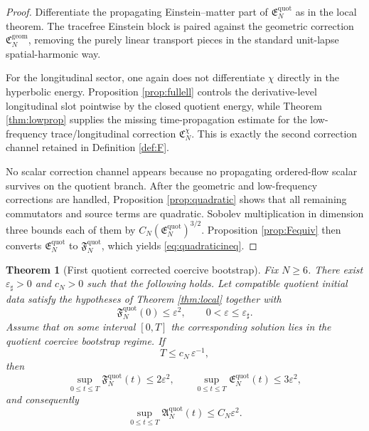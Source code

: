 \documentclass[11pt]{article}
\newtheorem{theorem}{Theorem}
\begin{document}
\begin{proof}
Differentiate the propagating Einstein--matter part of \(\mathfrak E_N^{\mathrm{quot}}\) as in the local theorem. The tracefree Einstein block is paired against the geometric correction \(\mathfrak C_N^{\mathrm{geom}}\), removing the purely linear transport pieces in the standard unit-lapse spatial-harmonic way.

For the longitudinal sector, one again does not differentiate \(\chi\) directly in the hyperbolic energy. Proposition \ref{prop:fullell} controls the derivative-level longitudinal slot pointwise by the closed quotient energy, while Theorem \ref{thm:lowprop} supplies the missing time-propagation estimate for the low-frequency trace/longitudinal correction \(\mathfrak C_N^\chi\). This is exactly the second correction channel retained in Definition \ref{def:F}.

No scalar correction channel appears because no propagating ordered-flow scalar survives on the quotient branch. After the geometric and low-frequency corrections are handled, Proposition \ref{prop:quadratic} shows that all remaining commutators and source terms are quadratic. Sobolev multiplication in dimension three bounds each of them by \(C_N(\mathfrak E_N^{\mathrm{quot}})^{3/2}\). Proposition \ref{prop:Fequiv} then converts \(\mathfrak E_N^{\mathrm{quot}}\) to \(\mathfrak F_N^{\mathrm{quot}}\), which yields \eqref{eq:quadraticineq}.
\end{proof}

\begin{theorem}[First quotient corrected coercive bootstrap]
\label{thm:bootstrap}
Fix \(N\ge 6\). There exist \(\varepsilon_\sharp>0\) and \(c_N>0\) such that the following holds. Let compatible quotient initial data satisfy the hypotheses of Theorem \ref{thm:local} together with
\begin{equation}
\mathfrak F_N^{\mathrm{quot}}(0)\le \varepsilon^2,
\qquad
0<\varepsilon\le \varepsilon_\sharp.
\label{eq:initsmall}
\end{equation}
Assume that on some interval \([0,T]\) the corresponding solution lies in the quotient coercive bootstrap regime. If
\begin{equation}
T\le c_N\,\varepsilon^{-1},
\label{eq:Tbootstrap}
\end{equation}
then
\begin{equation}
\sup_{0\le t\le T}\mathfrak F_N^{\mathrm{quot}}(t)\le 2\varepsilon^2,
\qquad
\sup_{0\le t\le T}\mathfrak E_N^{\mathrm{quot}}(t)\le 3\varepsilon^2,
\label{eq:bootstrapimprove}
\end{equation}
and consequently
\begin{equation}
\sup_{0\le t\le T}\mathfrak A_N^{\mathrm{quot}}(t)\le C_N\varepsilon^2.
\label{eq:auximprove}
\end{equation}
\end{theorem}
\end{document}

